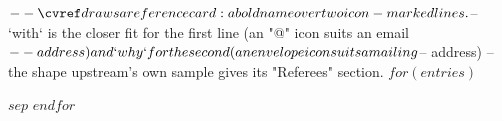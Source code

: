$-- \cvref draws a reference card: a bold name over two icon-marked lines.
$-- `with` is the closer fit for the first line (an "@" icon suits an email
$-- address) and `why` for the second (an envelope icon suits a mailing
$-- address) -- the shape upstream's own sample gives its "Referees" section.
$for(entries)$

$sep$\divider
$endfor$
